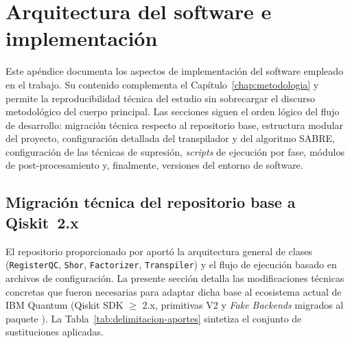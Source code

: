 \documentclass[12pt, spanish]{book}
\begin{document}
\chapter{Arquitectura del software e implementación}
\label{app:arquitectura-software-cap}

Este apéndice documenta los aspectos de implementación del software empleado en el trabajo. Su contenido complementa el Capítulo~\ref{chap:metodologia} y permite la reproducibilidad técnica del estudio sin sobrecargar el discurso metodológico del cuerpo principal. Las secciones siguen el orden lógico del flujo de desarrollo: migración técnica respecto al repositorio base, estructura modular del proyecto, configuración detallada del transpilador y del algoritmo SABRE, configuración de las técnicas de supresión, \textit{scripts} de ejecución por fase, módulos de post-procesamiento y, finalmente, versiones del entorno de software.

\section{Migración técnica del repositorio base a Qiskit~2.x}
\label{app:migracion-qiskit}

El repositorio proporcionado por \cite{villarreal} aportó la arquitectura general de clases (\texttt{RegisterQC}, \texttt{Shor}, \texttt{Factorizer}, \texttt{Transpiler}) y el flujo de ejecución basado en archivos de configuración. La presente sección detalla las modificaciones técnicas concretas que fueron necesarias para adaptar dicha base al ecosistema actual de IBM Quantum (Qiskit SDK $\geq$ 2.x, primitivas V2 y \textit{Fake Backends} migrados al paquete ). La Tabla~\ref{tab:delimitacion-aportes} sintetiza el conjunto de sustituciones aplicadas.

\newpage
\end{document}
